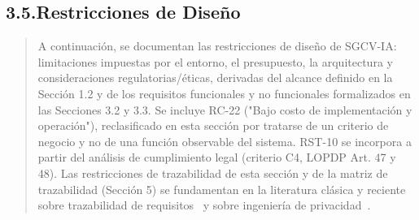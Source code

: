 \documentclass[
]{article}
\begin{document}
\subsection{3.5.Restricciones de Diseño}\label{restricciones-de-diseuxf1o}

\begin{quote}
A continuación, se documentan las restricciones de diseño de SGCV-IA:
limitaciones impuestas por el entorno, el presupuesto, la arquitectura y
consideraciones regulatorias/éticas, derivadas del alcance definido en
la Sección 1.2 y de los requisitos funcionales y no funcionales
formalizados en las Secciones 3.2 y 3.3. Se incluye RC-22 ("Bajo costo
de implementación y operación"), reclasificado en esta sección por
tratarse de un criterio de negocio y no de una función observable del
sistema. RST-10 se incorpora a partir del análisis de cumplimiento
legal (criterio C4, LOPDP Art. 47 y 48). Las restricciones de
trazabilidad de esta sección y de la matriz de trazabilidad (Sección
5) se fundamentan en la literatura clásica y reciente sobre
trazabilidad de requisitos~\cite{gotel1994,ramesh2001,clelandhuang2014,mucha2023,perspectivas2024}
y sobre ingeniería de privacidad~\cite{borovits2025}.
\end{quote}
\end{document}
